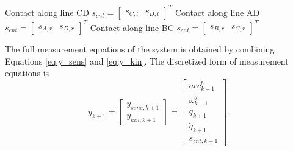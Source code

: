 \begin{algorithm}
\begin{algorithmic}
        \STATE Contact along line CD
        \RETURN $ s_{cnt}= \begin{bmatrix} s_{C,l} &s_{D,l} \end{bmatrix}^T$ 
        \STATE Contact along line AD 
        \RETURN $ s_{cnt}= \begin{bmatrix}s_{A,r} &s_{D,r}  \end{bmatrix}^T$ 
        \STATE Contact along line BC 
        \RETURN $ s_{cnt}= \begin{bmatrix}s_{B,r} &s_{C,r}  \end{bmatrix}^T$ 
        \ENDIF
    \ENDIF
    \end{algorithmic}
\end{algorithm}


The full measurement equations of the system is obtained by combining Equations \ref{eq:y_sens} and \ref{eq:y_kin}. The discretized form of measurement equations is
\begin{equation}
    \label{eq:y_msr}
    y_{k+1} = \begin{bmatrix} y_{sens,k+1} \\ y_{kin,k+1} \end{bmatrix}= \begin{bmatrix} acc^b_{k+1} \\ \omega^b_{k+1} \\ q_{k+1} \\ \dot q_{k+1} \\ s_{cnt,k+1} \end{bmatrix}.
\end{equation}






